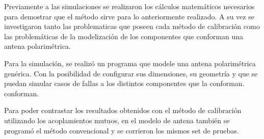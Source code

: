 Previamente a las simulaciones se realizaron los cálculos matemáticos necesarios para demostrar que el método sirve para 
lo anteriormente realizado. A su vez se investigaron tanto las problematicas que poseen cada método de calibración como
las problemáticas de la modelización de los componentes que conforman una antena polarimétrica.

Para la simulación, se realizó un programa que modele una antena polarimétrica genérica. Con la posibilidad de configurar 
sus dimensiones, su geometría y que se puedan simular casos de fallas a los distintos componentes que la conforman.
conforman.

Para poder contrastar los resultados obtenidos con el método de calibración utilizando los acoplamientos mutuos, en el modelo 
de antena también se programó el método convencional y se corrieron los mismos set de pruebas.


